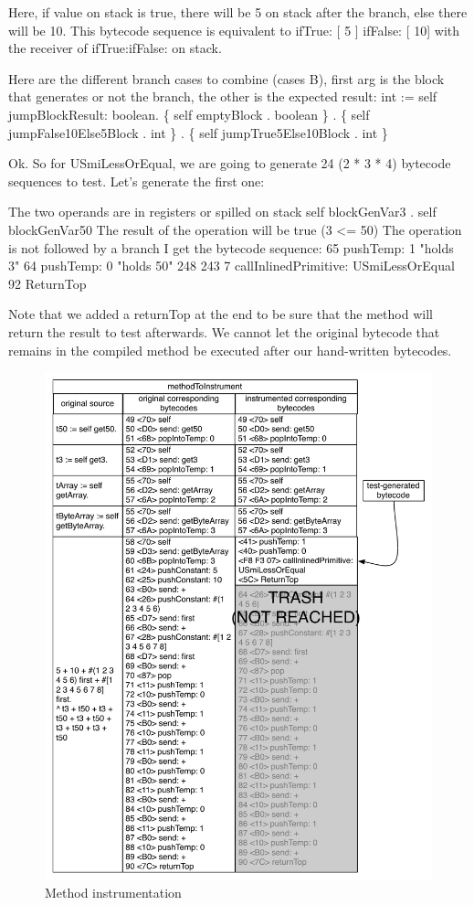 \documentclass[a4paper,12pt,twoside]{../includes/ThesisStyle}
\begin{document}
Here, if value on stack is true, there will be 5 on stack after the branch, else there will be 10. This bytecode sequence is equivalent to ifTrue: [ 5 ] ifFalse: [ 10] with the receiver of ifTrue:ifFalse: on stack.

Here are the different branch cases to combine (cases B), first arg is the block that generates or not the branch, the other is the expected result:
int := self jumpBlockResult: boolean.
\{ self emptyBlock . boolean \} .
\{ self jumpFalse10Else5Block . int \} .
\{ self jumpTrue5Else10Block . int \}

Ok. So for USmiLessOrEqual, we are going to generate 24 (2 * 3 * 4) bytecode sequences to test. Let's generate the first one:

The two operands are in registers or spilled on stack{ self blockGenVar3 . self blockGenVar50 }
The result of the operation will be true (3 <= 50)
The operation is not followed by a branch
I get the bytecode sequence:
65 pushTemp: 1 "holds 3"
64 pushTemp: 0 "holds 50"
248 243 7 callInlinedPrimitive: USmiLessOrEqual
92 ReturnTop

Note that we added a returnTop at the end to be sure that the method will return the result to test afterwards. We cannot let the original bytecode that remains in the compiled method be executed after our hand-written bytecodes.

\begin{figure}[!htp]
\begin{center}
\includegraphics[width=1.0\linewidth]{methodInstrumentation}
\caption{Method instrumentation}
\end{center}
\end{figure}
\end{document}
